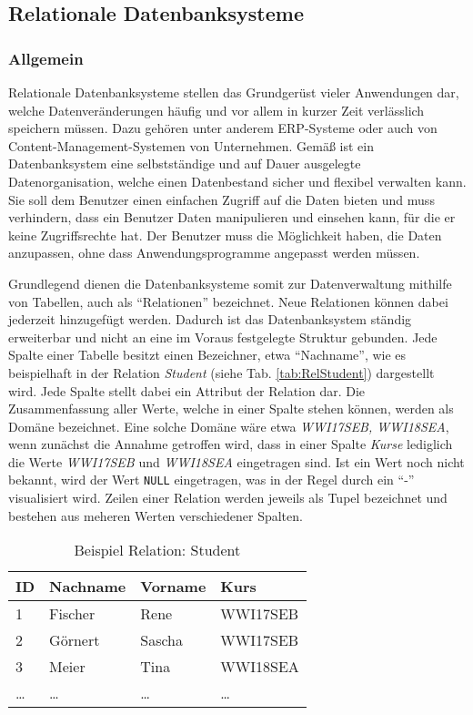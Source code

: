 \subsection{Relationale Datenbanksysteme}
\label{sec:grundlagen:reldb}
\subsubsection{Allgemein}

Relationale Datenbanksysteme stellen das Grundgerüst vieler Anwendungen dar, welche Datenveränderungen häufig und vor allem in kurzer Zeit verlässlich speichern müssen.
Dazu gehören unter anderem \ac{ERP}-Systeme oder auch von Content-Management-Systemen von Unternehmen.
Gemäß \citeauthor{Book_DB_2} ist ein Datenbanksystem eine selbstständige und auf Dauer ausgelegte Datenorganisation, welche einen Datenbestand sicher und flexibel verwalten kann.
Sie soll dem Benutzer einen einfachen Zugriff auf die Daten bieten und muss verhindern, dass ein Benutzer Daten manipulieren und einsehen kann, für die er keine Zugriffsrechte hat.
Der Benutzer muss die Möglichkeit haben, die Daten anzupassen, ohne dass Anwendungsprogramme angepasst werden müssen.\autocite[Vgl.][S.5 f.]{Book_DB_2}

Grundlegend dienen die Datenbanksysteme somit zur Datenverwaltung mithilfe von Tabellen, auch als \enquote{Relationen} bezeichnet.
Neue Relationen können dabei jederzeit hinzugefügt werden. 
Dadurch ist das Datenbanksystem ständig erweiterbar und nicht an eine im Voraus festgelegte Struktur gebunden.
Jede Spalte einer Tabelle besitzt einen Bezeichner, etwa \enquote{Nachname}, wie es beispielhaft in der Relation \emph{Student} (siehe Tab. \vref{tab:RelStudent}) dargestellt wird.
Jede Spalte stellt dabei ein Attribut der Relation dar.
Die Zusammenfassung aller Werte, welche in einer Spalte stehen können, werden als Domäne bezeichnet.
Eine solche Domäne wäre etwa \emph{WWI17SEB, WWI18SEA}, wenn zunächst die Annahme getroffen wird, dass in einer Spalte \emph{Kurse} lediglich die Werte \emph{WWI17SEB} und \emph{WWI18SEA} eingetragen sind.
Ist ein Wert noch nicht bekannt, wird der Wert \texttt{NULL} eingetragen, was in der Regel durch ein \enquote{-} visualisiert wird.
Zeilen einer Relation werden jeweils als Tupel bezeichnet und bestehen aus meheren Werten verschiedener Spalten.\autocite[Vgl.][S.9 ff.]{Book_DB_2}

\begin{table}
    \centering
    \begin{tabular}[h]{l | l | l | l}
        ID & Nachname & Vorname & Kurs \\ \hline
        1 & Fischer & Rene & WWI17SEB \\
        2 & Görnert & Sascha & WWI17SEB \\
        3 & Meier & Tina & WWI18SEA \\
        \dots & \dots & \dots & \dots \\
        \end{tabular}
        \caption{Beispiel Relation: Student}
        \label{tab:RelStudent}
\end{table}


